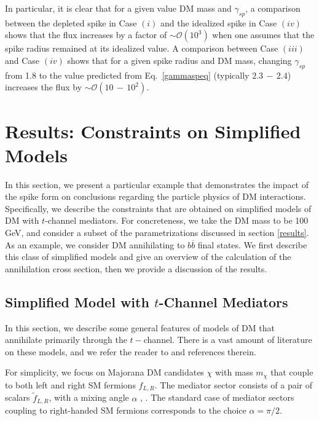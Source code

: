 \documentclass[11pt]{article}
\begin{document}
In particular, it is clear that for a given value DM mass and $\gamma_{sp}$, a comparison between the depleted spike in Case $(i)$ and the idealized spike in Case $(iv)$ shows that the flux increases by a factor of $\sim \mathcal{O}(10^3)$ when one assumes that the spike radius remained at its idealized value. A comparison between Case $(iii)$ and Case $(iv)$ shows that for a given spike radius and DM mass, changing $\gamma_{sp}$ from 1.8 to the value predicted from Eq.~\ref{gammaspeq} (typically $2.3 \, - \, 2.4$) increases the flux by  $\sim \mathcal{O}(10 \, - \, 10^2)$. 

\section{Results: Constraints on Simplified Models} \label{simpresults}

In this section, we present a particular example that demonstrates the impact of the spike form on conclusions regarding the particle physics of DM interactions. Specifically, we describe the constraints that are obtained on simplified models of DM with $t$-channel mediators. For concreteness, we take the DM mass to be 100 GeV, and consider a subset of the parametrizations discussed in section \ref{results}.  As an example, we consider DM annihilating to $b \overline{b}$ final states.  We first describe this class of simplified models and give an overview of the calculation of the annihilation cross section, then we provide a discussion of the results.

\subsection{Simplified Model with $t$-Channel Mediators}


In this section, we describe some general features of models of DM that annihilate primarily through the $t-$channel. There is a vast amount of literature on these models, and we refer the reader to \cite{Garny:2015wea} and references therein.

For simplicity, we  focus on Majorana DM candidates $\chi$ with mass $m_{\chi}$ that couple to both left and right SM fermions $f_{L,R}$. The mediator sector consists of a pair of scalars $\widetilde{f}_{L,R}$, with a mixing angle $\alpha$ \cite{Sandick:2016zut}, \cite{Kumar:2016cum}. The standard case of mediator sectors coupling to right-handed SM fermions corresponds to the choice $\alpha = \pi/2$.
\end{document}
